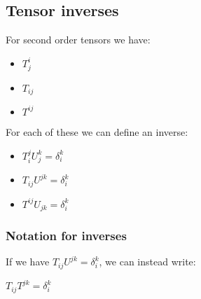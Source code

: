 
\subsection{Tensor inverses}

For second order tensors we have:

\begin{itemize}
\item \(T_j^i\)
\item \(T_{ij}\)
\item \(T^{ij}\)
\end{itemize}

For each of these we can define an inverse:

\begin{itemize}
\item \(T_i^jU_j^k=\delta_i^k\)
\item \(T_{ij}U^{jk}=\delta_i^k\)
\item \(T^{ij}U_{jk}=\delta_i^k\)
\end{itemize}

\subsubsection{Notation for inverses}

If we have \(T_{ij}U^{jk}=\delta_i^k\), we can instead write:

\(T_{ij}T^{jk}=\delta_i^k\)

